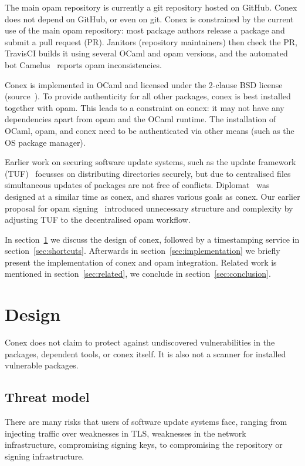 \documentclass[nocopyrightspace]{sigplanconf}
\begin{document}
The main opam repository is currently a git repository hosted on GitHub.
Conex does not depend on GitHub, or even on git.
Conex is constrained by the current use of the main opam repository:  most package authors release a package and submit a pull request (PR).
Janitors (repository maintainers) then check the PR, TravisCI builds it using several OCaml and opam versions, and the automated bot Camelus~\cite{camelus} reports opam inconsistencies.

Conex is implemented in OCaml and licensed under the 2-clause BSD license (source~\cite{conex}).
To provide authenticity for all other packages, conex is best installed together with opam.
This leads to a constraint on conex: it may not have any dependencies apart from opam and the OCaml runtime.
The installation of OCaml, opam, and conex need to be authenticated via other means (such as the OS package manager).

Earlier work on securing software update systems, such as the update framework (TUF)~\cite{tuf} focusses on distributing directories securely, but due to centralised files simultaneous updates of packages are not free of conflicts.
Diplomat~\cite{diplomat} was designed at a similar time as conex, and shares various goals as conex.
Our earlier proposal for opam signing~\cite{opamsigning} introduced unnecessary structure and complexity by adjusting TUF to the decentralised opam workflow.

In section~\ref{sec:design} we discuss the design of conex, followed by a timestamping service in section~\ref{sec:shortcuts}.
Afterwards in section~\ref{sec:implementation} we briefly present the implementation of conex and opam integration.
Related work is mentioned in section~\ref{sec:related}, we conclude in section~\ref{sec:conclusion}.

\section{Design} \label{sec:design}
Conex does not claim to protect against undiscovered vulnerabilities in the packages, dependent tools, or conex itself.
It is also not a scanner for installed vulnerable packages.

\subsection{Threat model}
There are many risks that users of software update systems face, ranging from injecting traffic over weaknesses in TLS, weaknesses in the network infrastructure, compromising signing keys, to compromising the repository or signing infrastructure.
\end{document}
